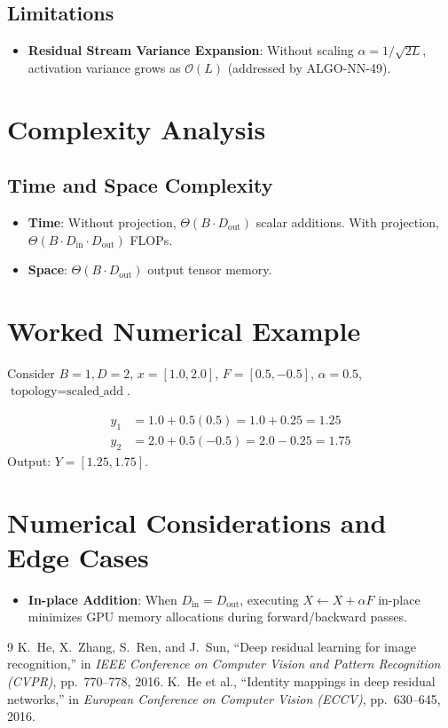 \documentclass[11pt,a4paper]{article}
\theoremstyle{definition}
\begin{document}
\subsection{Limitations}
\begin{itemize}
    \item \textbf{Residual Stream Variance Expansion}: Without scaling $\alpha = 1/\sqrt{2L}$, activation variance grows as $\mathcal{O}(L)$ (addressed by ALGO-NN-49).
\end{itemize}

\section{Complexity Analysis}

\subsection{Time and Space Complexity}
\begin{itemize}
    \item \textbf{Time}: Without projection, $\Theta(B \cdot D_{\text{out}})$ scalar additions. With projection, $\Theta(B \cdot D_{\text{in}} \cdot D_{\text{out}})$ FLOPs.
    \item \textbf{Space}: $\Theta(B \cdot D_{\text{out}})$ output tensor memory.
\end{itemize}

\section{Worked Numerical Example}

Consider $B=1, D=2$, $x = [1.0, 2.0]$, $F = [0.5, -0.5]$, $\alpha = 0.5$, $\text{topology} = \text{scaled\_add}$.

\begin{align}
y_1 &= 1.0 + 0.5(0.5) = 1.0 + 0.25 = 1.25 \\
y_2 &= 2.0 + 0.5(-0.5) = 2.0 - 0.25 = 1.75
\end{align}
Output: $Y = [1.25, 1.75]$.

\section{Numerical Considerations and Edge Cases}

\begin{itemize}
    \item \textbf{In-place Addition}: When $D_{\text{in}} = D_{\text{out}}$, executing $X \leftarrow X + \alpha F$ in-place minimizes GPU memory allocations during forward/backward passes.
\end{itemize}

\begin{thebibliography}{9}
 K.~He, X.~Zhang, S.~Ren, and J.~Sun, ``Deep residual learning for image recognition,'' in \emph{IEEE Conference on Computer Vision and Pattern Recognition (CVPR)}, pp.~770--778, 2016.
 K.~He et al., ``Identity mappings in deep residual networks,'' in \emph{European Conference on Computer Vision (ECCV)}, pp.~630--645, 2016.
\end{thebibliography}
\end{document}
